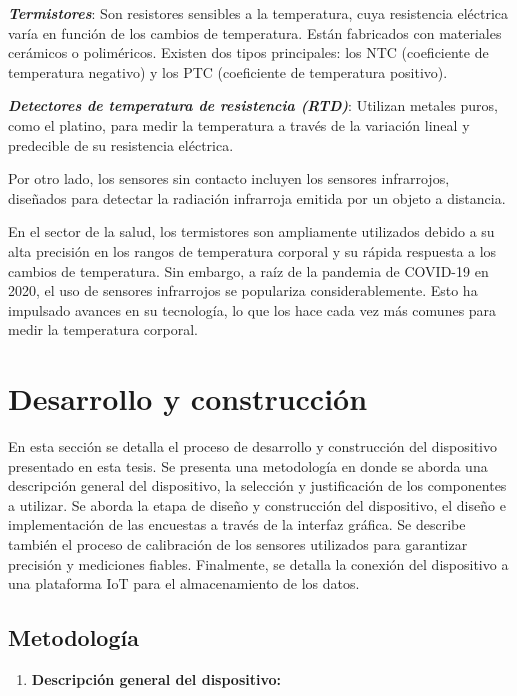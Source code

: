 \documentclass[
  letterpaper,
  DIV=11,
  numbers=noendperiod]{scrreport}
\providecommand{\tightlist}{%
  \setlength{\itemsep}{0pt}\setlength{\parskip}{0pt}}\usepackage{longtable,booktabs,array}
\begin{document}
\textbf{\emph{Termistores}}: Son resistores sensibles a la temperatura,
cuya resistencia eléctrica varía en función de los cambios de
temperatura. Están fabricados con materiales cerámicos o poliméricos.
Existen dos tipos principales: los NTC (coeficiente de temperatura
negativo) y los PTC (coeficiente de temperatura positivo).

\textbf{\emph{Detectores de temperatura de resistencia (RTD)}}: Utilizan
metales puros, como el platino, para medir la temperatura a través de la
variación lineal y predecible de su resistencia eléctrica.

Por otro lado, los sensores sin contacto incluyen los sensores
infrarrojos, diseñados para detectar la radiación infrarroja emitida por
un objeto a distancia.

En el sector de la salud, los termistores son ampliamente utilizados
debido a su alta precisión en los rangos de temperatura corporal y su
rápida respuesta a los cambios de temperatura. Sin embargo, a raíz de la
pandemia de COVID-19 en 2020, el uso de sensores infrarrojos se
populariza considerablemente. Esto ha impulsado avances en su
tecnología, lo que los hace cada vez más comunes para medir la
temperatura corporal.


\chapter{Desarrollo y construcción}\label{desarrollo-y-construcciuxf3n}

En esta sección se detalla el proceso de desarrollo y construcción del
dispositivo presentado en esta tesis. Se presenta una metodología en
donde se aborda una descripción general del dispositivo, la selección y
justificación de los componentes a utilizar. Se aborda la etapa de
diseño y construcción del dispositivo, el diseño e implementación de las
encuestas a través de la interfaz gráfica. Se describe también el
proceso de calibración de los sensores utilizados para garantizar
precisión y mediciones fiables. Finalmente, se detalla la conexión del
dispositivo a una plataforma IoT para el almacenamiento de los datos.

\section{Metodología}\label{metodologuxeda}

\begin{enumerate}
\def\labelenumi{\arabic{enumi}.}
\tightlist
\item
  \textbf{Descripción general del dispositivo:}
\end{enumerate}
\end{document}
